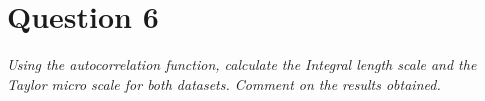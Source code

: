 \section*{Question 6}
\textit{Using the autocorrelation function, calculate the Integral length scale and the Taylor micro scale for both datasets. Comment on the results obtained.}
